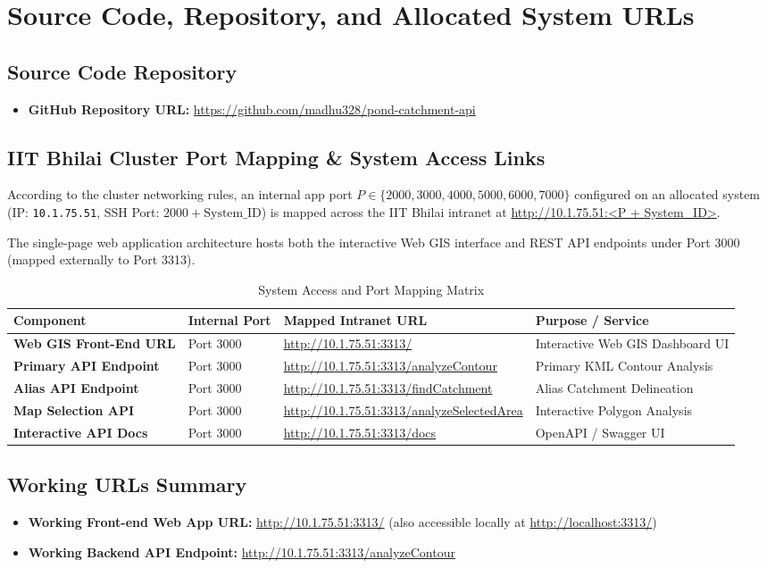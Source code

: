 \documentclass[manuscript,screen,review]{acmart}
\begin{document}
\section{Source Code, Repository, and Allocated System URLs}
\label{sec:appendix}

\subsection{Source Code Repository}
\begin{itemize}
    \item \textbf{GitHub Repository URL:} \url{https://github.com/madhu328/pond-catchment-api}
\end{itemize}

\subsection{IIT Bhilai Cluster Port Mapping \& System Access Links}
According to the cluster networking rules, an internal app port $P \in \{2000, 3000, 4000, 5000, 6000, 7000\}$ configured on an allocated system (IP: \texttt{10.1.75.51}, SSH Port: $2000 + \text{System\_ID}$) is mapped across the IIT Bhilai intranet at \url{http://10.1.75.51:<P + System_ID>}.

The single-page web application architecture hosts both the interactive Web GIS interface and REST API endpoints under Port 3000 (mapped externally to Port 3313).

\begin{table}[h]
  \caption{System Access and Port Mapping Matrix}
  \label{tab:system_urls}
  \begin{tabular}{llll}
    \toprule
    Component & Internal Port & Mapped Intranet URL & Purpose / Service \\
    \midrule
    \textbf{Web GIS Front-End URL} & Port 3000 & \url{http://10.1.75.51:3313/} & Interactive Web GIS Dashboard UI \\
    \textbf{Primary API Endpoint} & Port 3000 & \url{http://10.1.75.51:3313/analyzeContour} & Primary KML Contour Analysis \\
    \textbf{Alias API Endpoint} & Port 3000 & \url{http://10.1.75.51:3313/findCatchment} & Alias Catchment Delineation \\
    \textbf{Map Selection API} & Port 3000 & \url{http://10.1.75.51:3313/analyzeSelectedArea} & Interactive Polygon Analysis \\
    \textbf{Interactive API Docs} & Port 3000 & \url{http://10.1.75.51:3313/docs} & OpenAPI / Swagger UI \\
    \bottomrule
  \end{tabular}
\end{table}

\subsection{Working URLs Summary}
\begin{itemize}
    \item \textbf{Working Front-end Web App URL:} \url{http://10.1.75.51:3313/} (also accessible locally at \url{http://localhost:3313/})
    \item \textbf{Working Backend API Endpoint:} \url{http://10.1.75.51:3313/analyzeContour}
\end{itemize}
\end{document}
